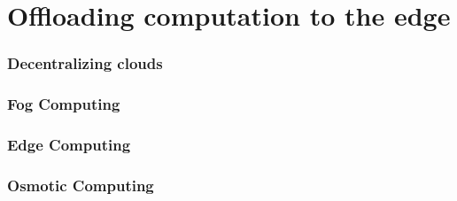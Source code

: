 \section{Offloading computation to the edge} 
\label{sec:offloading_comp}

\subsubsection{Decentralizing clouds}

\subsubsection{Fog Computing}

\subsubsection{Edge Computing}

\subsubsection{Osmotic Computing}
